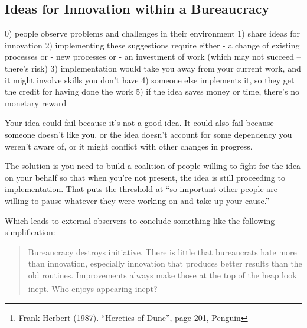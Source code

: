 \subsection{Ideas for Innovation within a Bureaucracy\label{sec:innovation}}



0) people observe problems and challenges in their environment
1) share ideas for innovation
2) implementing these suggestions require either 
    - a change of existing processes or 
    - new processes or 
    - an investment of work (which may not succeed -- there's risk)
3) implementation would take you away from your current work, and it might involve skills you don't have
4) someone else implements it, so they get the credit for having done the work
5) if the idea saves money or time, there's no monetary reward

Your idea could fail because it's not a good idea. It could also fail because someone doesn't like you, or the idea doesn't account for some dependency you weren't aware of, or it might conflict with other changes in progress.

The solution is you need to build a coalition of people willing to fight for the idea on your behalf so that when you're not present, the idea is still proceeding to implementation. That puts the threshold at ``so important other people are willing to pause whatever they were working on and take up your cause.''


Which leads to external observers to conclude something like the following simplification:
\begin{quote}
Bureaucracy destroys initiative. There is little that bureaucrats hate more than innovation, especially innovation that produces better results than the old routines. Improvements always make those at the top of the heap look inept. Who enjoys appearing inept?\footnote{Frank Herbert (1987). ``Heretics of Dune'', page 201, Penguin}
\end{quote}
